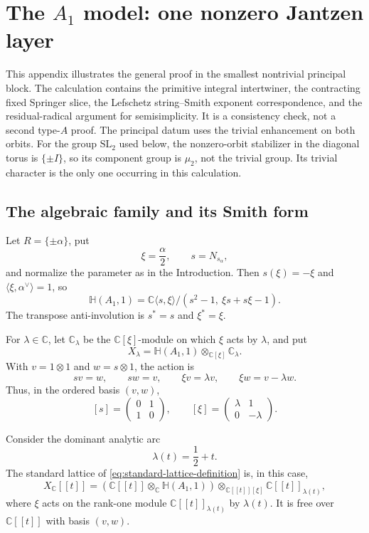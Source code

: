 \documentclass[11pt]{amsart}
\theoremstyle{definition}
\theoremstyle{remark}
\newcommand{\Hh}{\mathbb H}
\newcommand{\C}{\mathbb C}
\newcommand{\A}{\C[[t]]}
\begin{document}
\renewcommand{\theequation}{B.\arabic{equation}}
\setcounter{equation}{0}
\section{The \texorpdfstring{$A_1$}{A1} model: one nonzero Jantzen layer}
\label{app:rank-one}

This appendix illustrates the general proof in the smallest nontrivial
principal block.  The calculation contains the primitive integral
intertwiner, the contracting fixed Springer slice, the Lefschetz
string--Smith exponent correspondence, and the residual-radical argument
for semisimplicity.  It is a consistency check, not a second type-$A$ proof.
The principal datum uses the trivial enhancement on both orbits.
For the group $\mathrm{SL}_2$ used below, the nonzero-orbit stabilizer
in the diagonal torus is $\{\pm I\}$, so its component group is
$\mu_2$, not the trivial group.  Its trivial character is the only one
occurring in this calculation.

\subsection{The algebraic family and its Smith form}

Let $R=\{\pm\alpha\}$, put
\[
 \xi=\frac{\alpha}{2},\qquad s=N_{s_\alpha},
\]
and normalize the parameter as in the Introduction.  Then
$s(\xi)=-\xi$ and $\langle\xi,\alpha^\vee\rangle=1$, so
\[
 \Hh(A_1,1)
 =\mathbb C\langle s,\xi\rangle/
   (s^2-1,\ \xi s+s\xi-1).
\]
The transpose anti-involution is $s^*=s$ and $\xi^*=\xi$.

For $\lambda\in\mathbb C$, let $\mathbb C_\lambda$ be the
$\mathbb C[\xi]$-module on which $\xi$ acts by $\lambda$, and put
\[
 X_\lambda=\Hh(A_1,1)\otimes_{\mathbb C[\xi]}\mathbb C_\lambda.
\]
With $v=1\otimes1$ and $w=s\otimes1$, the action is
\[
 sv=w,\qquad sw=v,\qquad
 \xi v=\lambda v,\qquad \xi w=v-\lambda w.
\]
Thus, in the ordered basis $(v,w)$,
\begin{equation}\label{eq:A1-action}
 [s]=\begin{pmatrix}0&1\\1&0\end{pmatrix},
 \qquad
 [\xi]=\begin{pmatrix}\lambda&1\\0&-\lambda\end{pmatrix}.
\end{equation}

Consider the dominant analytic arc
\[
 \lambda(t)=\frac12+t.
\]
The standard lattice of \eqref{eq:standard-lattice-definition} is, in this
case,
\[
 X_\A=
 (\A\otimes_{\mathbb C}\Hh(A_1,1))
 \otimes_{\A[\xi]}\A_{\lambda(t)},
\]
where $\xi$ acts on the rank-one module $\A_{\lambda(t)}$ by
$\lambda(t)$.  It is free over $\A$ with basis $(v,w)$.
\end{document}
